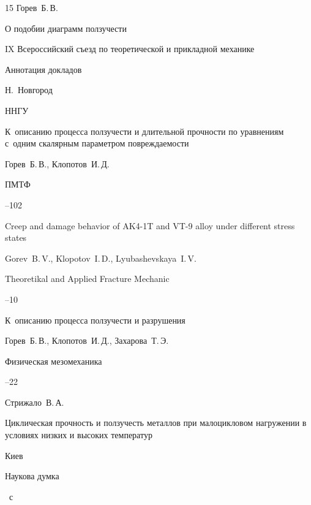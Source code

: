 \begin{thebibliography}{15}
\by Горев~Б.\,В.

\paper О подобии диаграмм ползучести

\inbook IX Всероссийский съезд по теоретической и прикладной механике

\bookinfo Аннотация докладов

\publaddr Н.~Новгород

\publ ННГУ






\paper К~описанию процесса ползучести и длительной прочности по уравнениям с~одним скалярным параметром повреждаемости

\by Горев~Б.\,В., Клопотов~И.\,Д.

\jour ПМТФ




--102








\paper Creep and damage behavior of AK4-1T and VT-9 alloy under different stress states

\by Gorev~B.\,V., Klopotov~I.\,D., Lyubashevskaya~I.\,V.

\jour Theoretikal and Applied Fracture Mechanic




--10




\paper К~описанию процесса ползучести и разрушения

\by Горев~Б.\,В., Клопотов~И.\,Д., Захарова~Т.\,Э.

\jour Физическая мезомеханика




--22




\by Стрижало~В.\,А.

\book Циклическая прочность и ползучесть металлов при малоцикловом нагружении в условиях низких и высоких температур

\publaddr Киев

\publ Наукова думка


~с



\end{thebibliography}









\makeengtitlem





%